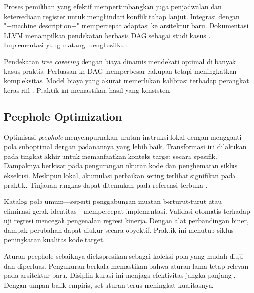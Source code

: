 \documentclass[../main.tex]{subfiles}
\begin{document}
Proses pemilihan yang efektif mempertimbangkan juga penjadwalan dan ketersediaan register untuk menghindari konflik tahap lanjut. Integrasi dengan "+machine description+" mempercepat adaptasi ke arsitektur baru. Dokumentasi LLVM menampilkan pendekatan berbasis DAG sebagai studi kasus \citep{LLVMOverview}. Implementasi yang matang menghasilkan 

Pendekatan \emph{tree covering} dengan biaya dinamis mendekati optimal di banyak kasus praktis. Perluasan ke DAG memperbesar cakupan tetapi meningkatkan kompleksitas. Model biaya yang akurat memerlukan kalibrasi terhadap perangkat keras riil \citep{WikiInstructionSelection}. Praktik ini memastikan hasil yang konsisten.

\subsection{Peephole Optimization}
Optimisasi \emph{peephole} menyempurnakan urutan instruksi lokal dengan mengganti pola suboptimal dengan padanannya yang lebih baik. Transformasi ini dilakukan pada tingkat akhir untuk memanfaatkan konteks target secara spesifik. Dampaknya berkisar pada pengurangan ukuran kode dan penghematan siklus eksekusi. Meskipun lokal, akumulasi perbaikan sering terlihat signifikan pada praktik. Tinjauan ringkas dapat ditemukan pada referensi terbuka \citep{WikiPeephole}.

Katalog pola umum—seperti penggabungan muatan berturut-turut atau eliminasi gerak identitas—mempercepat implementasi. Validasi otomatis terhadap uji regresi mencegah pengenalan regresi kinerja. Dengan alat perbandingan biner, dampak perubahan dapat diukur secara obyektif. Praktik ini menutup siklus peningkatan kualitas kode target.

\IfSubfilesClassLoaded{


}{}

Aturan peephole sebaiknya diekspresikan sebagai koleksi pola yang mudah diuji dan diperluas. Pengukuran berkala memastikan bahwa aturan lama tetap relevan pada arsitektur baru. Disiplin kurasi ini menjaga efektivitas jangka panjang \citep{WikiPeephole}. Dengan umpan balik empiris, set aturan terus meningkat kualitasnya.

\IfSubfilesClassLoaded{%


}{}
\end{document}
